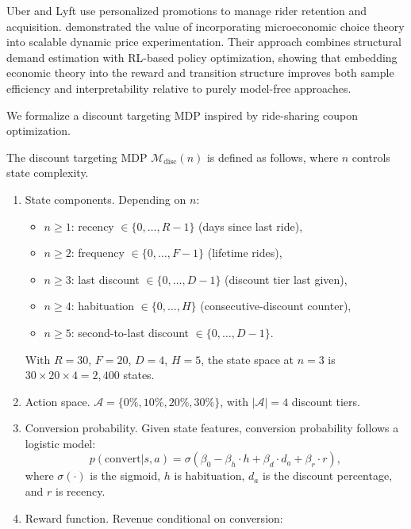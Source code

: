 Uber and Lyft use personalized promotions to manage rider retention and acquisition. \citet{Misra2019} demonstrated the value of incorporating microeconomic choice theory into scalable dynamic price experimentation. Their approach combines structural demand estimation with RL-based policy optimization, showing that embedding economic theory into the reward and transition structure improves both sample efficiency and interpretability relative to purely model-free approaches.

We formalize a discount targeting MDP inspired by ride-sharing coupon optimization.

\begin{definition}
\label{def:discount_mdp}
The discount targeting MDP $\mathcal{M}_{\mathrm{disc}}(n)$ is defined as follows, where $n$ controls state complexity.
\begin{enumerate}
    \item State components. Depending on $n$:
    \begin{itemize}
        \item $n \geq 1$: recency $\in \{0, \ldots, R-1\}$ (days since last ride),
        \item $n \geq 2$: frequency $\in \{0, \ldots, F-1\}$ (lifetime rides),
        \item $n \geq 3$: last discount $\in \{0, \ldots, D-1\}$ (discount tier last given),
        \item $n \geq 4$: habituation $\in \{0, \ldots, H\}$ (consecutive-discount counter),
        \item $n \geq 5$: second-to-last discount $\in \{0, \ldots, D-1\}$.
    \end{itemize}
    With $R = 30$, $F = 20$, $D = 4$, $H = 5$, the state space at $n = 3$ is $30 \times 20 \times 4 = 2{,}400$ states.
    \item Action space. $\mathcal{A} = \{0\%, 10\%, 20\%, 30\%\}$, with $|\mathcal{A}| = 4$ discount tiers.
    \item Conversion probability. Given state features, conversion probability follows a logistic model:
    \begin{equation}
    \label{eq:discount_conversion}
    p(\text{convert} | s, a) = \sigma\left( \beta_0 - \beta_h \cdot h + \beta_d \cdot d_a + \beta_r \cdot r \right),
    \end{equation}
    where $\sigma(\cdot)$ is the sigmoid, $h$ is habituation, $d_a$ is the discount percentage, and $r$ is recency.
    \item Reward function. Revenue conditional on conversion:

\end{enumerate}
\end{definition}
